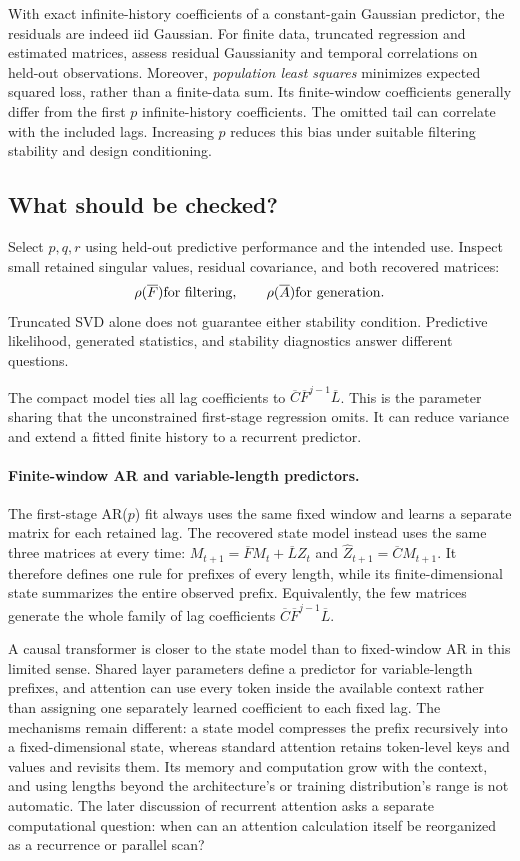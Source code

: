 \documentclass[11pt,twoside]{article}
\theoremstyle{definition}
\theoremstyle{remark}
\begin{document}
With exact infinite-history coefficients of a constant-gain Gaussian
predictor, the residuals are indeed iid Gaussian. For finite data,
truncated regression and estimated matrices, assess residual Gaussianity
and temporal correlations on held-out observations.
Moreover, \emph{population least squares} minimizes expected squared loss,
rather than a finite-data sum. Its finite-window coefficients generally
differ from the first \(p\) infinite-history coefficients. The omitted
tail can correlate with the included lags. Increasing \(p\) reduces
this bias under suitable filtering stability and design conditioning.

\subsection{What should be checked?}

Select \(p,q,r\) using held-out predictive performance and the intended
use. Inspect small retained singular values, residual covariance,
and both recovered matrices:
\[
 \rho(\overline F)\quad\hbox{for filtering},\qquad
 \rho(\overline A)\quad\hbox{for generation}.
\]
Truncated SVD alone does not guarantee
either stability condition. Predictive likelihood, generated statistics,
and stability diagnostics answer different questions.

The compact model ties all lag coefficients to
\(\overline C\overline F^{j-1}\overline L\). This is the parameter sharing
that the unconstrained first-stage regression omits. It can reduce
variance and extend a fitted finite history to a recurrent predictor.

\paragraph{Finite-window AR and variable-length predictors.}
The first-stage AR(\(p\)) fit always uses the same fixed window and learns a
separate matrix for each retained lag. The recovered state model instead uses
the same three matrices at every time:
\(
 M_{t+1}=\overline F M_t+\overline LZ_t
\)
and \(\widehat Z_{t+1}=\overline C M_{t+1}\).
It therefore defines one rule for prefixes of every length, while its
finite-dimensional state summarizes the entire observed prefix. Equivalently,
the few matrices generate the whole family of lag coefficients
\(\overline C\overline F^{j-1}\overline L\).

A causal transformer is closer to the state model than to fixed-window AR in
this limited sense. Shared layer parameters define a predictor for
variable-length prefixes, and attention can use every token inside the
available context rather than assigning one separately learned coefficient to
each fixed lag. The mechanisms remain different: a state model compresses the
prefix recursively into a fixed-dimensional state, whereas standard attention
retains token-level keys and values and revisits them. Its memory and
computation grow with the context, and using lengths beyond the architecture's
or training distribution's range is not automatic. The later discussion of
recurrent attention asks a separate computational question: when can an
attention calculation itself be reorganized as a recurrence or parallel scan?
\end{document}
